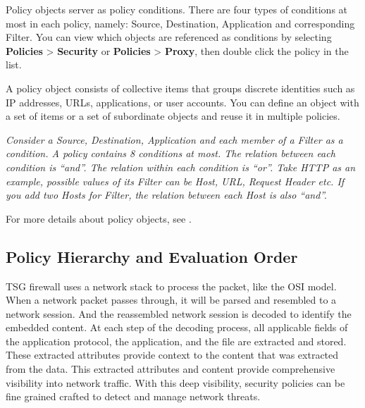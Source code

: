 Policy objects server as policy conditions. There are four types of conditions at most in each policy, namely: Source, Destination, Application and corresponding Filter. 
You can view which objects are referenced as conditions by selecting \textbf{Policies} > \textbf{Security} or \textbf{Policies} > \textbf{Proxy}, then double click the policy in the list.


A policy object consists of collective items that groups discrete identities such as IP addresses, URLs, applications, or user accounts. 
You can define an object with a set of items or a set of subordinate objects and reuse it in multiple policies. 


\notemark\textit{Consider a Source, Destination, Application and each member of a Filter as a condition. A policy contains 8 conditions at most. 
The relation between each condition is “and”. The relation within each condition is “or”. 
Take HTTP as an example, possible values of its Filter can be Host, URL, Request Header etc. If you add two Hosts for Filter, the relation between each Host is also “and”.}


For more details about policy objects, see \hyperlink{link:Objects}{\color{linkblue}{Objects}}.


\subsection*{\hypertarget{link:Policy Hierarchy and Evaluation Order}{Policy Hierarchy and Evaluation Order}}
\label{sec:policies:concepts:order}

TSG firewall uses a network stack to process the packet, like the OSI model. When a network packet passes through, it will be parsed and resembled to a network session. 
And the reassembled network session is decoded to identify the embedded content. At each step of the decoding process, all applicable fields of the application protocol, 
the application, and the file are extracted and stored. These extracted attributes provide context to the content that was extracted from the data. 
This extracted attributes and content provide comprehensive visibility into network traffic. With this deep visibility, 
security policies can be fine grained crafted to detect and manage network threats.


